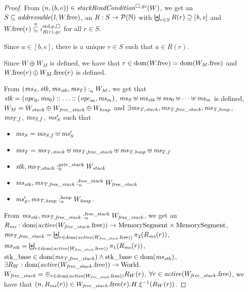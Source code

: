 \documentclass[a4paper]{article}
\begin{document}
\begin{proof}
  From $\npair{(b,e)}\in\stackReadCond{W}$, we get an $S \subseteq \addressable{\lin,
    \pwfree}$, an $R : S \rightarrow \powerset{\nats}$ with $\biguplus_{r \in S} R(r) \supseteq [\baddr,\eaddr]$ and $\pwfree(r)
  \nsubeq \stdreg{R(r),\gc}{\pur}$ for all $r \in S$.

  Since $a \in [b,e]$, there is a unique $r \in S$ such that $a \in R(r)$.

  Since $W \oplus W_M$ is defined, we have that $r \in \dom(\pwfree) =
  \dom(\pwfree[W_M])$ and $\pwfree(r) \oplus \pwfree[W_M](r)$ is defined.

  From $\memSat{(\ms_S,\stk,\ms_\stk,\ms_T)}{W_M}$, we get that
  $\stk = (\opc_0,\ms_0):: \dots :: (\opc_m,\ms_m)$,
  $\ms_S \uplus \ms_\stk \uplus \ms_0 \uplus \dots \uplus \ms_m$ is defined,
  $W_M = W_{\var{stack}} \oplus W_{\var{free\_stack}} \oplus W_{\var{heap}}$ and
  $\exists \ms_\var{T,stack}, \ms_\var{T,free\_stack}, \ms_\var{T,heap}$, $\ms_{T,f}$, $\ms_{S,f}$, $\ms_S'$ such that
  \begin{itemize}
  \item $\ms_S =\ms_{S,f} \uplus \ms_S'$
  \item $\ms_T = \ms_\var{T,stack} \uplus \ms_\var{T,free\_stack} \uplus
    \ms_\var{T,heap} \uplus \ms_{T,f}$
  \item $\memSatStack{\stk,\ms_\var{T,stack}}{W_{\var{stack}}}$
  \item $\memSatFStack{\ms_\stk,\ms_\var{T,free\_stack}}{W_{\var{free\_stack}}}$
  \item $\memSatHeap{\ms_S',\ms_\var{T,heap}}{W_\var{heap}}$.
  \end{itemize}

  From $\memSatFStack{\ms_\stk,\ms_\var{T,free\_stack}}{W_{\var{free\_stack}}}$, we get an
  $R_\ms : \dom(\activeReg{\pwfree[W_\var{free\_stack}]}) \fun \MemSeg \times \MemSeg$,
  $\ms_\var{T,free\_stack} = \biguplus_{r \in \dom(\activeReg{\pwfree[W_\var{free\_stack}]})} \pi_2(R_\ms(r))$,
  $\ms_\stk = \biguplus_{r \in \dom(\activeReg{\pwfree[W_\var{free\_stack}]})} \pi_1(R_\ms(r))$,
  $\stkb \in \dom(\ms_\var{T,free\_stack}) \wedge \stkb \in \dom(\ms_\stk)$,
  $\exists R_W : \dom(\activeReg{\pwfree[W_\var{free\_stack}]}) \fun \World\ldotp$
  $W_\var{free\_stack} = \oplus_{r \in \dom(\activeReg{\pwfree[W_\var{free\_stack}]})} R_W(r)$,
  $\forall r \in \activeReg{\pwfree[W_\var{free\_stack}]}$, we have that
  $\npair{R_\ms(r)} \in  \pwfree[W_\var{free\_stack}](r).H \; \xi^{-1}(R_W(r))$.


\end{proof}
\end{document}
